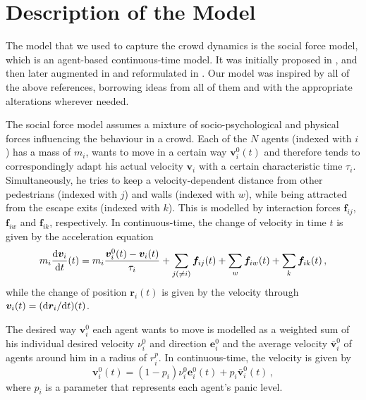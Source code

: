 \section{Description of the Model} \label{sec:4-model}
The model that we used to capture the crowd dynamics is the social force model, which is an agent-based continuous-time model. It was initially proposed in \cite{Helbing2000}, and then later augmented in \cite{Zainuddin2010} and reformulated in \cite{Wang2016}. Our model was inspired by all of the above references, borrowing ideas from all of them and with the appropriate alterations wherever needed. 

The social force model assumes a mixture of socio-psychological and physical forces influencing the behaviour in a crowd. Each of the $N$ agents (indexed with $i$) has a mass of $m_i$, wants to move in a certain way $\bm{v}_i^0(t)$ and therefore tends to correspondingly adapt his actual velocity $\bm{v}_i$ with a certain characteristic time $\tau_i$. Simultaneously, he tries to keep a velocity-dependent distance from other pedestrians (indexed with $j$) and walls (indexed with $w$), while being attracted from the escape exits (indexed with $k$). This is modelled by interaction forces $\bm{f}_{ij}$, $\bm{f}_{iw}$ and $\bm{f}_{ik}$, respectively. In continuous-time, the change of velocity in time $t$ is given by the acceleration equation
\begin{equation} \label{eq:acceleration}
	m_i \frac{\mathrm{d}\bm{v}_i}{\mathrm{d} t}(t) = m_i \frac{\bm{v}_i^0(t) -\bm{v}_i(t)}{\tau_i} + \sum_{j(\neq i)}^{}\bm{f}_{ij}(t) + \sum_{w}^{}\bm{f}_{iw}(t) + \sum_{k}^{}\bm{f}_{ik}(t) \,,
\end{equation}
while the change of position $\bm{r}_i(t)$ is given by the velocity through $\bm{v}_i(t) = (\mathrm{d}\bm{r}_i / \mathrm{d} t) (t)$.

The desired way $\bm{v}_i^0$ each agent wants to move is modelled as a weighted sum of his individual desired velocity $\nu_i^0$ and direction $\bm{e}_i^0$ and the average velocity $\bar{\bm{v}}_i^0$ of agents around him in a radius of $r_i^p$. In continuous-time, the velocity is given by
\begin{equation} \label{eq:vi}
	\bm{v}_i^0(t) = (1-p_i) \nu_i^0 \bm{e}_i^0(t) + p_i \bar{\bm{v}}_i^0(t) \,,
\end{equation}
where $p_i$ is a parameter that represents each agent's panic level.

